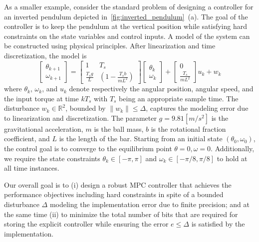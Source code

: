As a smaller example, consider the standard problem of designing a controller for an inverted pendulum depicted in~\autoref{fig:inverted_pendulum}~{(a)}.
The goal of the controller is to keep the pendulum at the vertical position while satisfying hard constraints on the state variables and control inputs.
A model of the system can be constructed using physical principles. 
After linearization and time discretization, the model is
	\begin{equation}
		\begin{bmatrix}
			 \theta_{k+1}\\
			\omega_{k+1}
		\end{bmatrix}=
		\begin{bmatrix}
			1 & T_s\\
			\frac{T_sg}{L}& (1-\frac{T_sb}{mL^2})		
		\end{bmatrix}
		\begin{bmatrix}
			\theta_k\\
			\omega_k
		\end{bmatrix}+
		\begin{bmatrix}
			0\\
			\frac{T_s}{mL^2}
		\end{bmatrix}u_k + w_k
		\label{eq:pendul_ss}
	\end{equation}
where $\theta_k$, $\omega_k$, and $u_k$ denote respectively the angular position, angular speed, 
and the input torque at time $kT_s$ with $T_s$ being an appropriate sample time.
The disturbance $w_k\in\mathbb R^2$, bounded by $\|w_k\|\leq \Delta$, captures the modeling error due to 
linearization and discretization. 
The parameter $g=9.81 [m/s^2]$ is the gravitational acceleration, $m$ is the ball mass, $b$ is the rotational fraction coefficient, 
and $L$ is the length of the bar. 
Starting from an initial state $(\theta_0,\omega_0)$, the control goal is to converge to the equilibrium point 
$\theta=0, \omega=0$.
Additionally, we require the state constraints $\theta_k\in[-\pi,\pi]$ and $\omega_k\in[-\pi/8,\pi/8]$ to hold at all time instances.

Our overall goal is to 
(i) design a robust MPC controller that achieves the performance objectives including hard constraints in spite of a bounded
disturbance $\Delta$ modeling the implementation error due to finite precision;
and at the same time
(ii) to minimize the total number of bits that are required for storing the explicit controller 
while ensuring the error $e\leq \Delta$ is satisfied by the implementation.

